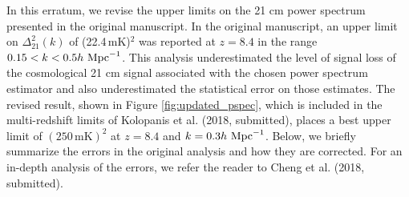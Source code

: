 \documentclass[onecolumn]{emulateapj} \shorttitle{}
\newcommand{\hMpci}{h\ {\rm Mpc}^{-1}}
\newcommand{\mKlimit}{(22.4\,\textrm{mK})$^2$ }
\newcommand{\revisedmklimit}{(250\,\textrm{mK})^2}
\newcommand{\kolopaniscitet}{Kolopanis et al. (2018, submitted)}
\newcommand{\chengcitet}{\textrm{Cheng et al. (2018, submitted)}}
\begin{document}
\maketitle

In this erratum, we revise the upper limits on the 21 cm power spectrum
presented in the original manuscript.  In the original manuscript, an upper
limit on $\Delta_{21}^2(k)$ of \mKlimit was reported at $z=8.4$ in the range
$0.15<k<0.5\hMpci$.  This analysis underestimated the level of signal loss of
the cosmological 21 cm signal associated with the chosen power spectrum
estimator and also underestimated the statistical error on those estimates.
The revised result, shown in Figure \ref{fig:updated_pspec}, which is included
in the multi-redshift limits of \kolopaniscitet, places a best upper limit of
$\revisedmklimit$ at $z=8.4$ and $k=0.3\hMpci$.  Below, we briefly
summarize the errors in the original analysis and how they are corrected. For
an in-depth analysis of the errors, we refer the reader to \chengcitet.
\end{document}
